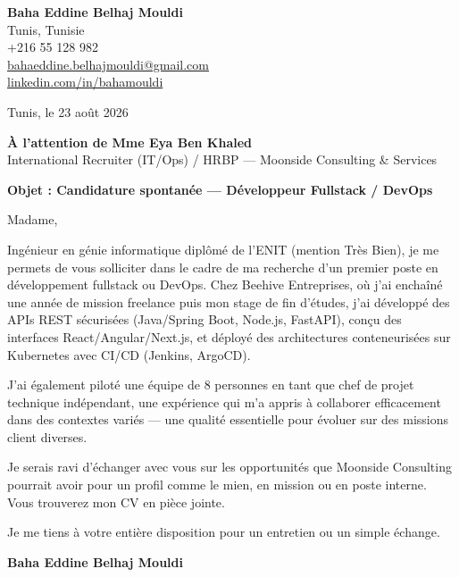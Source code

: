 \documentclass[a4paper,11pt]{article}
\begin{document}
\begin{flushright}
{\bfseries Baha Eddine Belhaj Mouldi}\\
Tunis, Tunisie\\
+216 55 128 982\\
\href{mailto:bahaeddine.belhajmouldi@gmail.com}{bahaeddine.belhajmouldi@gmail.com}\\
\href{https://linkedin.com/in/bahamouldi}{linkedin.com/in/bahamouldi}
\end{flushright}
\vspace{0.8cm}
\begin{flushleft}
Tunis, le 23 ao\^ut 2026
\vspace{0.8cm}

{\bfseries \`A l'attention de Mme Eya Ben Khaled}\\
International Recruiter (IT/Ops) / HRBP --- Moonside Consulting \& Services
\vspace{0.6cm}

{\bfseries Objet : Candidature spontan\'ee --- D\'eveloppeur Fullstack / DevOps}
\end{flushleft}
\vspace{0.6cm}
Madame,

Ing\'enieur en g\'enie informatique dipl\^om\'e de l'ENIT (mention Tr\`es Bien), je me permets de vous solliciter dans le cadre de ma recherche d'un premier poste en d\'eveloppement fullstack ou DevOps. Chez Beehive Entreprises, o\`u j'ai encha\^in\'e une ann\'ee de mission freelance puis mon stage de fin d'\'etudes, j'ai d\'evelopp\'e des APIs REST s\'ecuris\'ees (Java/Spring Boot, Node.js, FastAPI), con\c cu des interfaces React/Angular/Next.js, et d\'eploy\'e des architectures conteneuris\'ees sur Kubernetes avec CI/CD (Jenkins, ArgoCD).

J'ai \'egalement pilot\'e une \'equipe de 8 personnes en tant que chef de projet technique ind\'ependant, une exp\'erience qui m'a appris \`a collaborer efficacement dans des contextes vari\'es --- une qualit\'e essentielle pour \'evoluer sur des missions client diverses.

Je serais ravi d'\'echanger avec vous sur les opportunit\'es que Moonside Consulting pourrait avoir pour un profil comme le mien, en mission ou en poste interne. Vous trouverez mon CV en pi\`ece jointe.

Je me tiens \`a votre enti\`ere disposition pour un entretien ou un simple \'echange.

\vspace{0.8cm}
\begin{flushright}
{\bfseries Baha Eddine Belhaj Mouldi}
\end{flushright}
\end{document}
